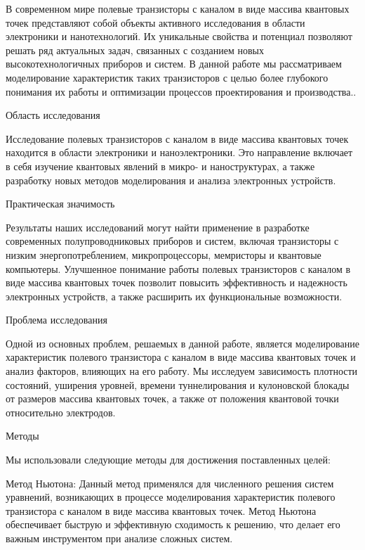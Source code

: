\documentclass[a4paper,14pt]{extarticle}
\begin{document}


\tableofcontents
\pagebreak


В современном мире полевые транзисторы с каналом в виде массива квантовых точек представляют собой объекты активного исследования в области электроники и нанотехнологий. Их уникальные свойства и потенциал позволяют решать ряд актуальных задач, связанных с созданием новых высокотехнологичных приборов и систем. В данной работе мы рассматриваем моделирование характеристик таких транзисторов с целью более глубокого понимания их работы и оптимизации процессов проектирования и производства..

Область исследования

Исследование полевых транзисторов с каналом в виде массива квантовых точек находится в области электроники и наноэлектроники. Это направление включает в себя изучение квантовых явлений в микро- и наноструктурах, а также разработку новых методов моделирования и анализа электронных устройств.

Практическая значимость

Результаты наших исследований могут найти применение в разработке современных полупроводниковых приборов и систем, включая транзисторы с низким энергопотреблением, микропроцессоры, мемристоры и квантовые компьютеры. Улучшенное понимание работы полевых транзисторов с каналом в виде массива квантовых точек позволит повысить эффективность и надежность электронных устройств, а также расширить их функциональные возможности.

Проблема исследования

Одной из основных проблем, решаемых в данной работе, является моделирование характеристик полевого транзистора с каналом в виде массива квантовых точек и анализ факторов, влияющих на его работу. Мы исследуем зависимость плотности состояний, уширения уровней, времени туннелирования и кулоновской блокады от размеров массива квантовых точек, а также от положения квантовой точки относительно электродов.

Методы

Мы использовали следующие методы для достижения поставленных целей:

Метод Ньютона: Данный метод применялся для численного решения систем уравнений, возникающих в процессе моделирования характеристик полевого транзистора с каналом в виде массива квантовых точек. Метод Ньютона обеспечивает быструю и эффективную сходимость к решению, что делает его важным инструментом при анализе сложных систем.
\end{document}

